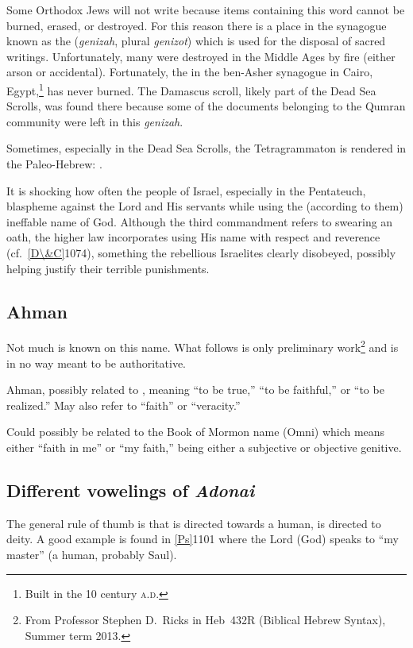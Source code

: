 Some Orthodox Jews will not write  because items containing this word cannot be burned, erased, or destroyed. For this reason there is a place in the synagogue known as the  (\textit{genizah}, plural \textit{genizot}) which is used for the disposal of sacred writings. Unfortunately, many  were destroyed in the Middle Ages by fire (either arson or accidental). Fortunately, the  in the ben-Asher synagogue in Cairo, Egypt,\footnote{Built in the 10 century \textsc{a.d.}} has never burned. The Damascus scroll, likely part of the Dead Sea Scrolls, was found there because some of the documents belonging to the Qumran community were left in this \textit{genizah}.

Sometimes, especially in the Dead Sea Scrolls, the Tetragrammaton is rendered in the Paleo-Hebrew: .

It is shocking how often the people of Israel, especially in the Pentateuch, blaspheme against the Lord and His servants while using the (according to them) ineffable name of God. Although the third commandment refers to swearing an oath, the higher law incorporates using His name with respect and reverence (cf.~\vref{D\&C}{107}{4}), something the rebellious Israelites clearly disobeyed, possibly helping justify their terrible punishments.

\subsection{Ahman}
Not much is known on this name. What follows is only preliminary work\footnote{From Professor Stephen D.\ Ricks in Heb~432R (Biblical Hebrew Syntax), Summer term 2013.} and is in no way meant to be authoritative.

Ahman, possibly related to , meaning ``to be true,'' ``to be faithful,'' or ``to be realized.'' May also refer to ``faith'' or ``veracity.''

Could possibly be related to the Book of Mormon name  (Omni) which means either ``faith in me'' or ``my faith,''  being either a subjective or objective genitive.

\subsection{Different vowelings of \textit{Adonai}}\label{app:adonai}
The general rule of thumb is that  is directed towards a human,  is directed to deity. A good example is found in \vref{Ps}{110}{1} where the Lord (God) speaks to ``my master'' (a human, probably Saul).
